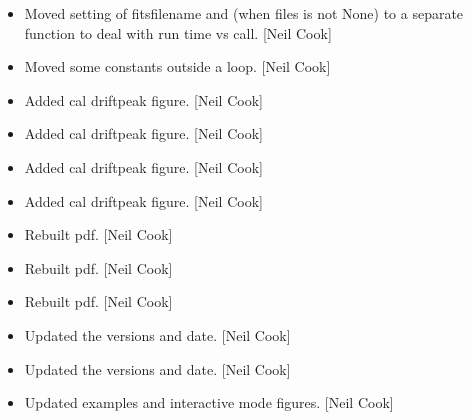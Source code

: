 \documentclass[a4paper,10pt,english]{report}
\begin{document}
\begin{itemize}
\item {} 
Moved setting of fitsfilename and  (when files is not
None) to a separate function to deal with run time vs call. {[}Neil
Cook{]}

\item {} 
Moved some constants outside a loop. {[}Neil Cook{]}

\item {} 
Added cal driftpeak figure. {[}Neil Cook{]}

\item {} 
Added cal driftpeak figure. {[}Neil Cook{]}

\item {} 
Added cal driftpeak figure. {[}Neil Cook{]}

\item {} 
Added cal driftpeak figure. {[}Neil Cook{]}

\item {} 
Rebuilt pdf. {[}Neil Cook{]}

\item {} 
Rebuilt pdf. {[}Neil Cook{]}

\item {} 
Rebuilt pdf. {[}Neil Cook{]}

\item {} 
Updated the versions and date. {[}Neil Cook{]}

\item {} 
Updated the versions and date. {[}Neil Cook{]}

\item {} 
Updated examples and interactive mode figures. {[}Neil Cook{]}

\end{itemize}
\end{document}
